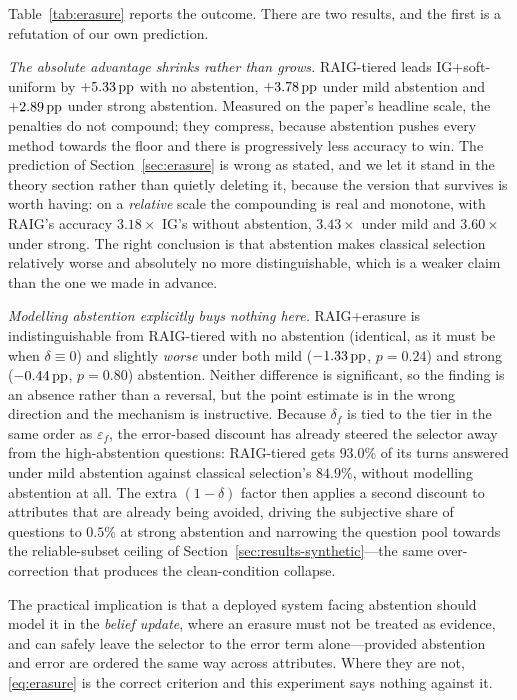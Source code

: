 Table~\ref{tab:erasure} reports the outcome. There are two results, and the
first is a refutation of our own prediction.

\emph{The absolute advantage shrinks rather than grows.} RAIG-tiered leads
IG+soft-uniform by $+5.33\,\text{pp}$ with no abstention, $+3.78\,\text{pp}$ under mild
abstention and $+2.89\,\text{pp}$ under strong abstention. Measured on the paper's
headline scale, the penalties do not compound; they compress, because
abstention pushes every method towards the floor and there is progressively
less accuracy to win. The prediction of Section~\ref{sec:erasure} is wrong as
stated, and we let it stand in the theory section rather than quietly deleting
it, because the version that survives is worth having: on a \emph{relative}
scale the compounding is real and monotone, with RAIG's accuracy $3.18\times$
IG's without abstention, $3.43\times$ under mild and $3.60\times$ under strong.
The right conclusion is that abstention makes classical selection relatively
worse and absolutely no more distinguishable, which is a weaker claim than the
one we made in advance.

\emph{Modelling abstention explicitly buys nothing here.} RAIG+erasure is
indistinguishable from RAIG-tiered with no abstention (identical, as it must be
when $\delta \equiv 0$) and slightly \emph{worse} under both mild
($-1.33\,\text{pp}$, $p = 0.24$) and strong ($-0.44\,\text{pp}$, $p = 0.80$) abstention. Neither
difference is significant, so the finding is an absence rather than a reversal,
but the point estimate is in the wrong direction and the mechanism is
instructive. Because $\delta_f$ is tied to the tier in the same order as
$\varepsilon_f$, the error-based discount has already steered the selector away
from the high-abstention questions: RAIG-tiered gets $93.0\%$ of its turns
answered under mild abstention against classical selection's $84.9\%$, without
modelling abstention at all. The extra $(1-\delta)$ factor then applies a
second discount to attributes that are already being avoided, driving the
subjective share of questions to $0.5\%$ at strong abstention and narrowing the
question pool towards the reliable-subset ceiling of
Section~\ref{sec:results-synthetic}---the same over-correction that produces
the clean-condition collapse.

The practical implication is that a deployed system facing abstention should
model it in the \emph{belief update}, where an erasure must not be treated as
evidence, and can safely leave the selector to the error term alone---provided
abstention and error are ordered the same way across attributes. Where they
are not, \eqref{eq:erasure} is the correct criterion and this experiment says
nothing against it.

